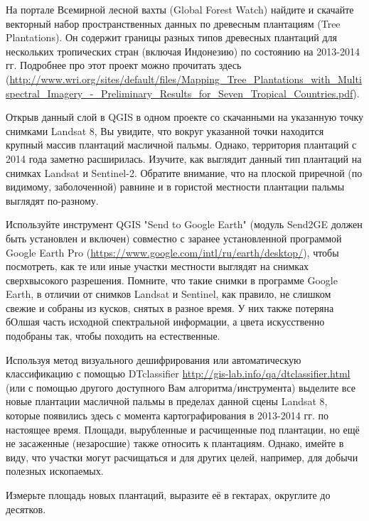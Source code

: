 
На портале Всемирной лесной вахты (Global Forest Watch) найдите 
и скачайте векторный набор пространственных данных по древесным плантациям (Tree Plantations). Он 
содержит границы разных типов древесных плантаций для нескольких тропических стран (включая Индонезию) 
по состоянию на 2013-2014 гг. Подробнее про этот проект можно прочитать здесь (\url{http://www.wri.org/sites/default/files/Mapping_Tree_Plantations_with_Multispectral_Imagery_-_Preliminary_Results_for_Seven_Tropical_Countries.pdf}).

Открыв данный слой в QGIS в одном проекте со скачанными на указанную точку снимками Landsat 8, Вы увидите, что вокруг указанной точки находится крупный массив плантаций масличной пальмы. Однако, территория плантаций с 2014 года заметно расширилась. Изучите, как выглядит данный тип плантаций на снимках Landsat и Sentinel-2. Обратите внимание, что на плоской приречной (по видимому, заболоченной) равнине и в гористой местности плантации пальмы выглядят по-разному.

Используйте инструмент QGIS "Send to Google Earth" (модуль Send2GE должен быть установлен и включен) 
совместно с заранее установленной программой Google Earth Pro (\url{https://www.google.com/intl/ru/earth/desktop/}), чтобы посмотреть, как те или иные участки местности выглядят на снимках сверхвысокого разрешения. Помните, что такие снимки в программе Google Earth, в отличии от снимков Landsat и Sentinel, как правило, не слишком свежие и собраны из кусков, снятых в разное время. У них также потеряна бОлшая часть исходной спектральной информации, а цвета искусственно подобраны так, чтобы походить на естественные.

Используя метод визуального дешифрирования или автоматическую классификацию с помощью DTclassifier \url{http://gis-lab.info/qa/dtclassifier.html} (или с помощью другого доступного Вам алгоритма/инструмента) выделите все новые плантации масличной пальмы в пределах данной сцены Landsat 8, которые появились здесь с момента картографирования в 2013-2014 гг. по настоящее время. Площади, вырубленные и расчищенные под плантации, но ещё не засаженные (незаросшие) также относить к плантациям. Однако, имейте в виду, что участки могут расчищаться и для других целей, например, для добычи полезных ископаемых.

Измерьте площадь новых плантаций, выразите её в гектарах, округлите до десятков.